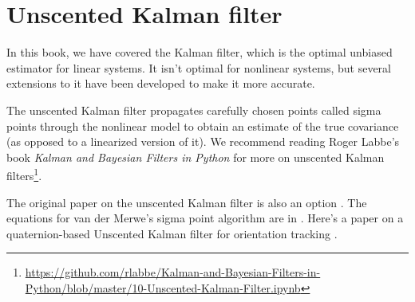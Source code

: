 \section{Unscented Kalman filter}
\label{sec:ukf}

In this book, we have covered the Kalman filter, which is the optimal unbiased
estimator for linear \glspl{system}. It isn't optimal for nonlinear
\glspl{system}, but several extensions to it have been developed to make it more
accurate.

The unscented Kalman filter propagates carefully chosen points called sigma
points through the nonlinear model to obtain an estimate of the true covariance
(as opposed to a linearized version of it). We recommend reading Roger Labbe's
book \textit{Kalman and Bayesian Filters in Python} for more on unscented Kalman
filters\footnote{\url{https://github.com/rlabbe/Kalman-and-Bayesian-Filters-in-Python/blob/master/10-Unscented-Kalman-Filter.ipynb}}.

The original paper on the unscented Kalman filter is also an option
\cite{bib:unscented_kalman_filter}. The equations for van der Merwe's sigma
point algorithm are in \cite{bib:unscented_kalman_filter_2}. Here's a paper on a
quaternion-based Unscented Kalman filter for orientation tracking
\cite{bib:ukf_state_tracking}.
